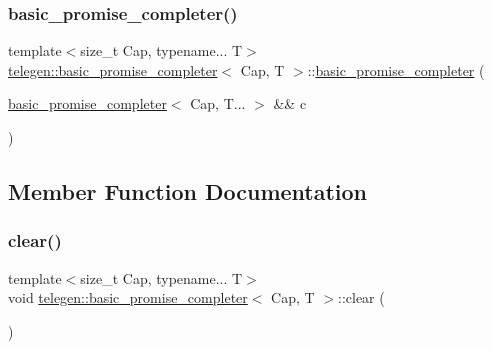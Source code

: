 \mbox{\label{classtelegen_1_1basic__promise__completer_a700737fd96d72348a11da75d61617c60}} 
\subsubsection{\texorpdfstring{basic\+\_\+promise\+\_\+completer()}{basic\_promise\_completer()}\hspace{0.1cm}{\footnotesize\ttfamily [3/3]}}
{\footnotesize\ttfamily template$<$size\+\_\+t Cap, typename... T$>$ \\
\hyperlink{classtelegen_1_1basic__promise__completer}{telegen\+::basic\+\_\+promise\+\_\+completer}$<$ Cap, T $>$\+::\hyperlink{classtelegen_1_1basic__promise__completer}{basic\+\_\+promise\+\_\+completer} (\begin{DoxyParamCaption}\item[{\hyperlink{classtelegen_1_1basic__promise__completer}{basic\+\_\+promise\+\_\+completer}$<$ Cap, T... $>$ \&\&}]{c }\end{DoxyParamCaption})\hspace{0.3cm}{\ttfamily [delete]}}



\subsection{Member Function Documentation}
\mbox{\label{classtelegen_1_1basic__promise__completer_a402470cdd51db55aafe9a342e5c807eb}} 
\subsubsection{\texorpdfstring{clear()}{clear()}}
{\footnotesize\ttfamily template$<$size\+\_\+t Cap, typename... T$>$ \\
void \hyperlink{classtelegen_1_1basic__promise__completer}{telegen\+::basic\+\_\+promise\+\_\+completer}$<$ Cap, T $>$\+::clear (\begin{DoxyParamCaption}{ }\end{DoxyParamCaption})\hspace{0.3cm}{\ttfamily [inline]}}

